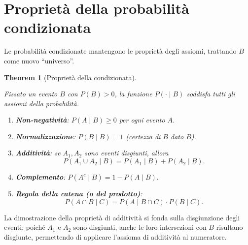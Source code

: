 \documentclass[
  letterpaper,
  DIV=11,
  numbers=noendperiod,
  oneside]{scrreprt}
\theoremstyle{definition}
\theoremstyle{plain}
\newtheorem{theorem}{Theorem}[chapter]
\theoremstyle{definition}
\theoremstyle{remark}
\begin{document}
\section{Proprietà della probabilità
condizionata}\label{proprietuxe0-della-probabilituxe0-condizionata}

Le probabilità condizionate mantengono le proprietà degli assiomi,
trattando \(B\) come nuovo ``universo''.

\begin{theorem}[Proprietà della
condizionata]\protect\hypertarget{thm-conditional-properties}{}\label{thm-conditional-properties}

Fissato un evento \(B\) con \(P(B) > 0\), la funzione
\(P(\cdot \mid B)\) soddisfa tutti gli assiomi della probabilità.

\begin{enumerate}
\def\labelenumi{\arabic{enumi}.}
\item
  \textbf{Non-negatività}: \(P(A \mid B) \geq 0\) per ogni evento \(A\).
\item
  \textbf{Normalizzazione}: \(P(B \mid B) = 1\) (certezza di \(B\) dato
  \(B\)).
\item
  \textbf{Additività}: se \(A_1, A_2\) sono eventi disgiunti, allora
  \[P(A_1 \cup A_2 \mid B) = P(A_1 \mid B) + P(A_2 \mid B).\]
\item
  \textbf{Complemento}: \(P(A^c \mid B) = 1 - P(A \mid B).\)
\item
  \textbf{Regola della catena (o del prodotto)}:
  \[P(A \cap B \mid C) = P(A \mid B \cap C) \cdot P(B \mid C).\]
\end{enumerate}

\end{theorem}

La dimostrazione della proprietà di additività si fonda sulla
disgiunzione degli eventi: poiché \(A_1\) e \(A_2\) sono disgiunti,
anche le loro intersezioni con \(B\) risultano disgiunte, permettendo di
applicare l'assioma di additività al numeratore.
\end{document}
